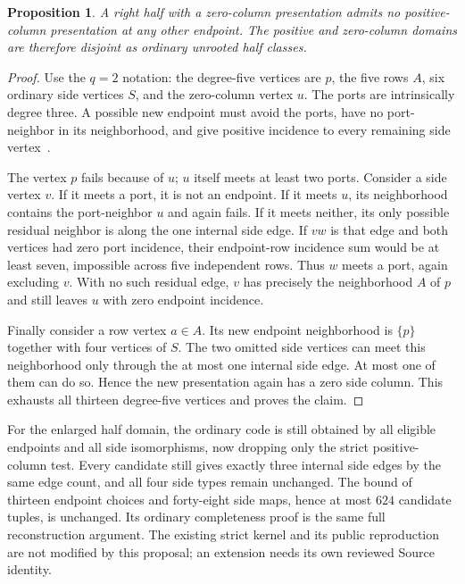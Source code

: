 \documentclass[11pt]{article}
\newtheorem{proposition}[theorem]{Proposition}
\begin{document}
\begin{proposition}\label{strictdisjoint}
A right half with a zero-column presentation admits no positive-column
presentation at any other endpoint. The positive and zero-column domains
are therefore disjoint as ordinary unrooted half classes.
\end{proposition}
\begin{proof}
Use the $q=2$ notation: the degree-five vertices are $p$, the five rows
$A$, six ordinary side vertices $S$, and the zero-column vertex $u$.
The ports are intrinsically degree three. A possible new endpoint must
avoid the ports, have no port-neighbor in its neighborhood, and give
positive incidence to every remaining side vertex~\cite{right}.

The vertex $p$ fails because of $u$; $u$ itself meets at least two ports.
Consider a side vertex $v$. If it meets a port, it is not an endpoint.
If it meets $u$, its neighborhood contains the port-neighbor $u$ and
again fails. If it meets neither, its only possible residual neighbor
is along the one internal side edge. If $vw$ is that edge and both
vertices had zero port incidence, their endpoint-row incidence sum
would be at least seven, impossible across five independent rows.
Thus $w$ meets a port, again excluding $v$. With no such residual edge,
$v$ has precisely the neighborhood $A$ of $p$ and still leaves $u$
with zero endpoint incidence.

Finally consider a row vertex $a\in A$. Its new endpoint neighborhood
is $\{p\}$ together with four vertices of $S$. The two omitted side
vertices can meet this neighborhood only through the at most one
internal side edge. At most one of them can do so. Hence the new
presentation again has a zero side column. This exhausts all thirteen
degree-five vertices and proves the claim.
\end{proof}

For the enlarged half domain, the ordinary code is still obtained by
all eligible endpoints and all side isomorphisms, now dropping only the
strict positive-column test. Every candidate still gives exactly three
internal side edges by the same edge count, and all four side types
remain unchanged. The bound of thirteen endpoint choices and forty-eight
side maps, hence at most $624$ candidate tuples, is unchanged. Its
ordinary completeness proof is the same full reconstruction argument.
The existing strict kernel and its public reproduction are not modified
by this proposal; an extension needs its own reviewed Source identity.
\end{document}
